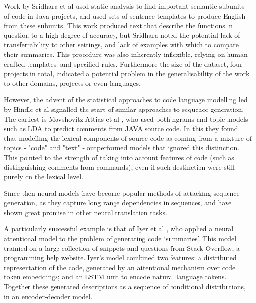 Work by Sridhara et al \cite{sridhara_[not_2010}  used static analysis to find important semantic subunits of code in Java projects, and used sets of sentence templates to produce English from these subunits.
This work produced text that describe the functions in question to a high degree of accuracy, but Sridhara noted the potential lack of transferrability to other settings, and lack of examples with which to compare their summaries.  
This procedure was also inherently inflexible, relying on human crafted templates, and specified rules. Furthermore the size of the dataset, four projects in total, indicated a potential problem in the generalisability of the work to other domains, projects or even languages.

However, the advent of the statistical approaches to code language modelling led by Hindle et al \cite{hindle_naturalness_nodate} signalled the start of similar approaches to sequence generation. The earliest is Movshovitz-Attias et al \cite{movshovitz-attias_natural_nodate}, who used both ngrams and topic models such as LDA to predict comments from JAVA source code. In this they found that modelling the lexical components of source code as coming from a mixture of topics - "code" and "text" - outperformed models that ignored this distinction.  This pointed to the strength of taking into account features of code (such as distinguishing comments from commands), even if such destinction were still purely on the lexical level.

Since then neural models have become popular methods of attacking sequence generation, as they capture long range dependencies in sequences, and have shown great promise in other neural translation tasks.

A particularly successful example is that of Iyer et al \cite{iyer_summarizing_2016}, who applied a neural attentional model to the problem of generating code `summaries'. This model trainied on a large collection of snippets and questions from Stack Overflow, a programming help website.   Iyer's model combined two features: a distributed representation of the code, generated by an attentional mechanism \cite{luong_effective_2015} over code token embeddings; and an LSTM unit \cite{hochreiter_long_1997} to encode natural language tokens. Together these generated descriptions as a sequence of conditional distributions, in an encoder-decoder model. 

